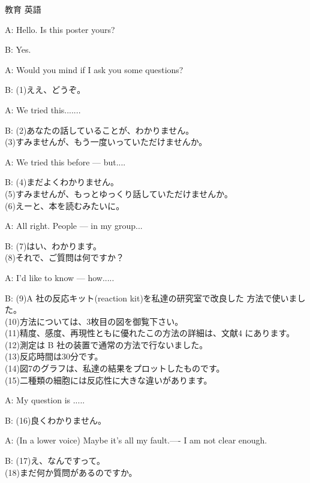 \documentclass[fleqn]{jbook}
\begin{document}
\begin{question}{教育 英語}{}
\begin{subquestions}
  \begin{list}{}{\itemindent=0mm \topsep=0mm \itemsep=-0.5mm }
  \item[A:]  Hello. Is this poster yours?
  \item[B:]  Yes.
  \item[A:]  Would you mind if I ask you some questions?
  \item[B:]  (1)ええ、どうぞ。
  \item[A:]  We tried this.......
  \item[B:]  (2)あなたの話していることが、わかりません。\\
             (3)すみませんが、もう一度いっていただけませんか。
  \item[A:]  We tried this before --- but....
  \item[B:]  (4)まだよくわかりません。\\
             (5)すみませんが、もっとゆっくり話していただけませんか。\\
             (6)えーと、本を読むみたいに。
  \item[A:]  All right. People --- in my group...
  \item[B:]  (7)はい、わかります。\\
             (8)それで、ご質問は何ですか？
  \item[A:]  I'd like to know --- how.....
  \item[B:]  (9)A 社の反応キット(reaction kit)を私達の研究室で改良した
             方法で使いました。\\
             (10)方法については、3枚目の図を御覧下さい。\\
             (11)精度、感度、再現性ともに優れたこの方法の詳細は、文献4
             にあります。\\
             (12)測定は B 社の装置で通常の方法で行ないました。\\
             (13)反応時間は30分です。\\
             (14)図7のグラフは、私達の結果をプロットしたものです。\\
             (15)二種類の細胞には反応性に大きな違いがあります。
  \item[A:]  My question is .....
  \item[B:]  (16)良くわかりません。
  \item[A:]  (In a lower voice) Maybe it's all my fault.---- 
             I am not clear enough.
  \item[B:]  (17)え、なんですって。\\
             (18)まだ何か質問があるのですか。\\

\end{list}
\end{subquestions}
\end{question}
\end{document}
